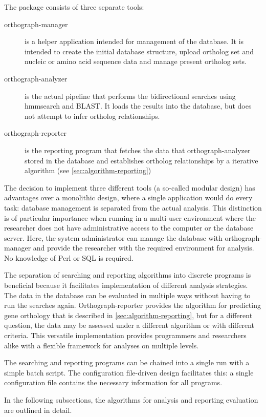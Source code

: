 \label{sec:algorithm}
The \pname package consists of three separate tools:

\begin{description}
	\item[orthograph-manager] is a helper application intended for management of
		the database. It is intended to create the initial database structure, upload
		ortholog set and nucleic or amino acid sequence data and manage present
		ortholog sets.
	\item[orthograph-analyzer] is the actual pipeline that performs the
		bidirectional searches using hmmsearch and BLAST. It loads the results into
		the database, but does not attempt to infer ortholog relationships. 
	\item[orthograph-reporter] is the reporting program that fetches the data that
		orthograph-analyzer stored in the database and establishes ortholog
		relationships by a iterative algorithm (see
		\autoref{sec:algorithm-reporting})
\end{description}

The decision to implement three different tools (a so-called modular design) has
advantages over a monolithic design, where a single application would do
every task: database management is separated from the actual analysis. This
distinction is of particular importance when running \pname in a multi-user
environment where the researcher does not have administrative access to the
computer or the database server. Here, the system administrator can manage the
database with orthograph-manager and provide the researcher with the required
environment for analysis. No knowledge of Perl or SQL is required.

The separation of searching and reporting algorithms into discrete programs is
beneficial because it facilitates implementation of different analysis
strategies. The data in the database can be evaluated in multiple ways without
having to run the searches again. Orthograph-reporter provides the algorithm for
predicting gene orthology that is described in
\autoref{sec:algorithm-reporting}, but for a different question, the data may be
assessed under a different algorithm or with different criteria. This versatile
implementation provides programmers and researchers alike with a flexible
framework for analyses on multiple levels. 

The searching and reporting programs can be chained into a single run
with a simple batch script. The configuration file-driven design facilitates
this: a single configuration file contains the necessary information for all
\pname programs.

In the following subsections, the algorithms for analysis and reporting
evaluation are outlined in detail.
